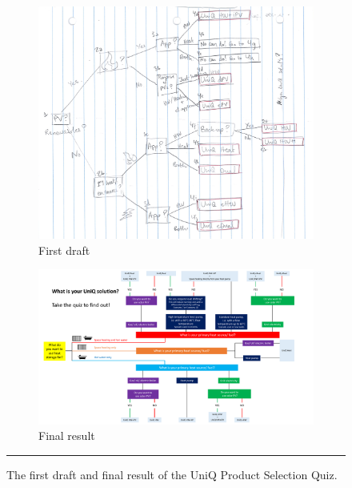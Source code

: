 

\begin{figure}[htbp]
    \centering
        \begin{subfigure}{.38\textwidth}
          \centering
          \includegraphics[width=\textwidth]{figures/QuizSketch.png}
          \caption{First draft}
          \label{fig:quiz_draft}
        \end{subfigure}
        \begin{subfigure}{.58\textwidth}
          \centering
          \includegraphics[width=\textwidth]{Appendices/final_quiz.pdf}
          \caption{Final result}
          \label{fig:quiz_final}
        \end{subfigure}
    \rule{\textwidth}{0.5pt} %
    \caption{The first draft and final result of the UniQ Product Selection Quiz.}
    \label{fig:quiz}
\end{figure}



